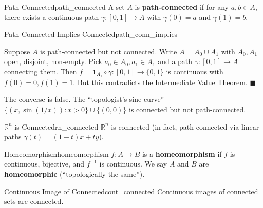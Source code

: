 \documentclass[11pt, letterpaper, openany]{book}
\renewenvironment{proof}[1][\proofname]{%
  \tcolorbox[blanker, breakable, left=1em,
    before skip=1em, after skip=1em,
    borderline west={2pt}{0pt}{MagicTeal!50},
    colback=MagicCream,
    before upper={\textcolor{MagicTeal}{\sffamily\bfseries #1.}\space}
  ]%
}{%
  \hfill\textcolor{MagicTeal}{\ensuremath{\blacksquare}}\endtcolorbox%
}
\begin{document}
\begin{defn}{Path-Connected}{path_connected}
A set $A$ is \textbf{path-connected} if for any $a, b \in A$, there exists a continuous path $\gamma: [0,1] \to A$ with $\gamma(0) = a$ and $\gamma(1) = b$.
\end{defn}

\begin{thm}{Path-Connected Implies Connected}{path_conn_implies}
\end{thm}

\begin{proof}
Suppose $A$ is path-connected but not connected. Write $A = A_0 \cup A_1$ with $A_0, A_1$ open, disjoint, non-empty. Pick $a_0 \in A_0, a_1 \in A_1$ and a path $\gamma: [0,1] \to A$ connecting them. Then $f = \mathbf{1}_{A_1} \circ \gamma: [0,1] \to \{0,1\}$ is continuous with $f(0) = 0, f(1) = 1$. But this contradicts the Intermediate Value Theorem.
\end{proof}

\begin{remark}
The converse is false. The ``topologist's sine curve'' $\{(x, \sin(1/x)) : x > 0\} \cup \{(0,0)\}$ is connected but not path-connected.
\end{remark}

\begin{thm}{$\mathbb{R}^n$ is Connected}{rn_connected}
$\mathbb{R}^n$ is connected (in fact, path-connected via linear paths $\gamma(t) = (1-t)x + ty$).
\end{thm}

\begin{defn}{Homeomorphism}{homeomorphism}
$f: A \to B$ is a \textbf{homeomorphism} if $f$ is continuous, bijective, and $f^{-1}$ is continuous. We say $A$ and $B$ are \textbf{homeomorphic} (``topologically the same'').
\end{defn}

\begin{thm}{Continuous Image of Connected}{cont_connected}
Continuous images of connected sets are connected.
\end{thm}
\end{document}
